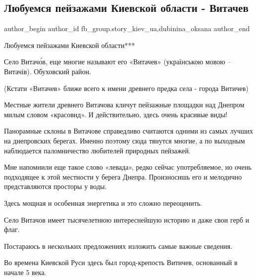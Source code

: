  
 
 
 
 
 
\subsection{Любуемся пейзажами Киевской области - Витачев}
\label{sec:25_10_2021.fb.fb_group.story_kiev_ua.1.vitachev}
 
\ifcmt
 author_begin
   author_id fb_group.story_kiev_ua,dubinina_oksana
 author_end
\fi

Любуемся пейзажами Киевской области***

Село Витачо́в, еще многие называют его «Витачев» (українською мовою – Витачів).
Обуховский район.

(Кстати «Витачев» ближе всего к имени древнего предка села - города Витичев)

Местные жители древнего Витачова кличут пейзажные площадки над Днепром милым
словом «красовид». И действительно, здесь очень красивые виды!

Панорамные склоны в Витачове справедливо считаются одними из самых лучших на
днепровских берегах. Именно поэтому сюда тянутся многие, а по выходным
наблюдается паломничество любителей природных пейзажей. 

Мне напомнили еще такое слово «левада», редко сейчас употребляемое, но очень
подходящее к этой местности у берега Днепра. Произносишь его и мелодично
представляются просторы у воды. 

Здесь мощная и особенная  энергетика и это  сложно переоценить. 

Село Витачов имеет тысячелетнюю интереснейшую историю и даже свои герб и флаг.

Постараюсь в нескольких предложениях изложить самые важные сведения.

Во времена Киевской Руси здесь был город-крепость Витичев, основанный в начале
5 века. 

